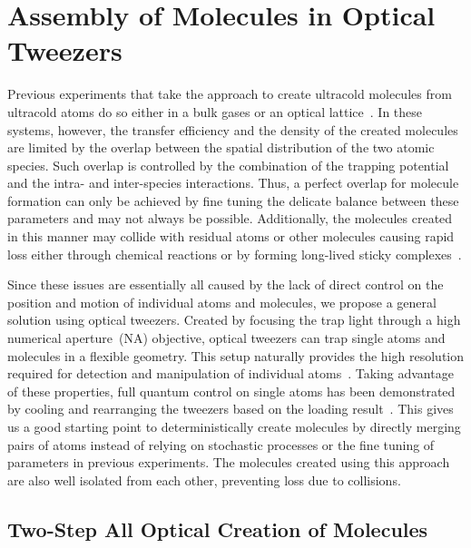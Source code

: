 \section{Assembly of Molecules in Optical Tweezers}
\label{ch:introduction:tweezers}

Previous experiments that take the approach to create ultracold molecules
from ultracold atoms do so either in a bulk gases
or an optical lattice~\cite{moses_creation_2015}.
In these systems, however, the transfer efficiency and
the density of the created molecules are limited
by the overlap between the spatial distribution of the two atomic species.
Such overlap is controlled by the combination of the trapping potential
and the intra- and inter-species interactions.
Thus, a perfect overlap for molecule formation can only be achieved by fine tuning
the delicate balance between these parameters and may not always be possible.
Additionally, the molecules created in this manner may collide
with residual atoms or other molecules causing rapid loss
either through chemical reactions or by forming long-lived sticky complexes~\cite{
  mayle_scattering_2013,croft_long-lived_2014,liu_photo-excitation_2020}.

Since these issues are essentially all caused by the lack of direct control
on the position and motion of individual atoms and molecules,
we propose a general solution using optical tweezers.
Created by focusing the trap light through a high numerical aperture~(NA) objective,
optical tweezers can trap single atoms and molecules in a flexible geometry.
This setup naturally provides the high resolution required
for detection and manipulation of individual atoms~\cite{schlosser_sub-poissonian_2001}.
Taking advantage of these properties, full quantum control on single atoms has been demonstrated
by cooling and rearranging the tweezers based on the loading result~\cite{
  barredo_atom-by-atom_2016,endres_atom-by-atom_2016}.
This gives us a good starting point to deterministically create molecules
by directly merging pairs of atoms instead of
relying on stochastic processes or the fine tuning of parameters in previous experiments.
The molecules created using this approach are also well isolated from each other,
preventing loss due to collisions.

\subsection{Two-Step All Optical Creation of Molecules}
\label{ch:introduction:tweezers:two-step}

